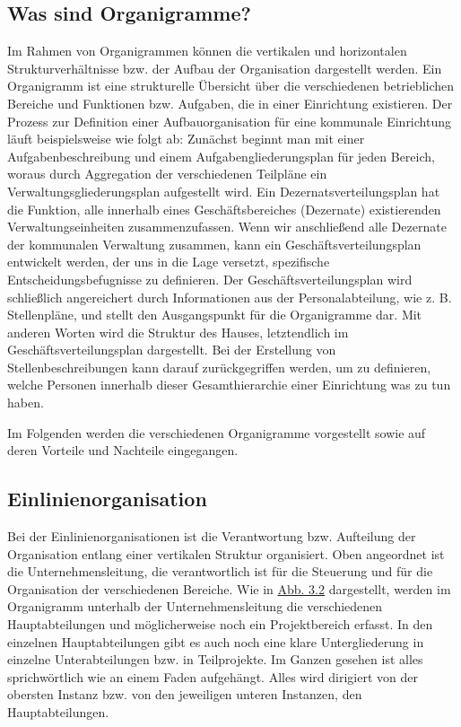 \documentclass[
  letterpaper,
]{book}
\begin{document}
\subsection{Was sind Organigramme?}\label{was-sind-organigramme}

Im Rahmen von Organigrammen können die vertikalen und horizontalen
Strukturverhältnisse bzw. der Aufbau der Organisation dargestellt
werden. Ein Organigramm ist eine strukturelle Übersicht über die
verschiedenen betrieblichen Bereiche und Funktionen bzw. Aufgaben, die
in einer Einrichtung existieren. Der Prozess zur Definition einer
Aufbauorganisation für eine kommunale Einrichtung läuft beispielsweise
wie folgt ab: Zunächst beginnt man mit einer Aufgabenbeschreibung und
einem Aufgabengliederungsplan für jeden Bereich, woraus durch
Aggregation der verschiedenen Teilpläne ein Verwaltungsgliederungsplan
aufgestellt wird. Ein Dezernatsverteilungsplan hat die Funktion, alle
innerhalb eines Geschäftsbereiches (Dezernate) existierenden
Verwaltungseinheiten zusammenzufassen. Wenn wir anschließend alle
Dezernate der kommunalen Verwaltung zusammen, kann ein
Geschäftsverteilungsplan entwickelt werden, der uns in die Lage
versetzt, spezifische Entscheidungsbefugnisse zu definieren. Der
Geschäftsverteilungsplan wird schließlich angereichert durch
Informationen aus der Personalabteilung, wie z. B. Stellenpläne, und
stellt den Ausgangspunkt für die Organigramme dar. Mit anderen Worten
wird die Struktur des Hauses, letztendlich im Geschäftsverteilungsplan
dargestellt. Bei der Erstellung von Stellenbeschreibungen kann darauf
zurückgegriffen werden, um zu definieren, welche Personen innerhalb
dieser Gesamthierarchie einer Einrichtung was zu tun haben.

Im Folgenden werden die verschiedenen Organigramme vorgestellt sowie auf
deren Vorteile und Nachteile eingegangen.

\subsection{Einlinienorganisation}\label{einlinienorganisation}

Bei der Einlinienorganisationen ist die Verantwortung bzw. Aufteilung
der Organisation entlang einer vertikalen Struktur organisiert. Oben
angeordnet ist die Unternehmensleitung, die verantwortlich ist für die
Steuerung und für die Organisation der verschiedenen Bereiche. Wie in
\hyperref[figure32]{Abb. 3.2} dargestellt, werden im Organigramm
unterhalb der Unternehmensleitung die verschiedenen Hauptabteilungen und
möglicherweise noch ein Projektbereich erfasst. In den einzelnen
Hauptabteilungen gibt es auch noch eine klare Untergliederung in
einzelne Unterabteilungen bzw. in Teilprojekte. Im Ganzen gesehen ist
alles sprichwörtlich wie an einem Faden aufgehängt. Alles wird dirigiert
von der obersten Instanz bzw. von den jeweiligen unteren Instanzen, den
Hauptabteilungen.
\end{document}
